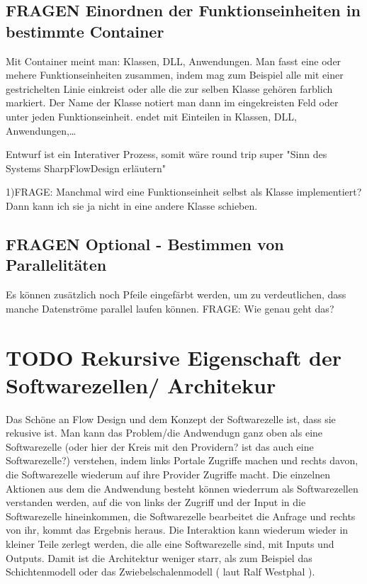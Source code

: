\documentclass[11pt]{article}
\begin{document}
\subsection{{\bfseries\sffamily FRAGEN} Einordnen der Funktionseinheiten in bestimmte Container}
\label{sec:orgheadline49}

Mit Container meint man: Klassen, DLL, Anwendungen.
Man fasst eine oder mehere Funktionseinheiten zusammen, indem mag zum Beispiel alle mit einer gestrichelten Linie einkreist oder alle die zur selben Klasse
gehören farblich markiert. Der Name der Klasse notiert man dann im eingekreisten Feld oder unter jeden Funktionseinheit.
  endet mit Einteilen in Klassen, DLL, Anwendungen,\ldots{}

Entwurf ist ein Interativer Prozess, somit wäre round trip super "Sinn des Systems SharpFlowDesign erläutern"

1)FRAGE: Manchmal wird eine Funktionseinheit selbst als Klasse implementiert? Dann kann ich sie ja nicht in eine andere Klasse schieben.

\subsection{{\bfseries\sffamily FRAGEN} Optional - Bestimmen von Parallelitäten}
\label{sec:orgheadline50}
Es können zusätzlich noch Pfeile eingefärbt werden, um zu verdeutlichen, dass
manche Datenströme parallel laufen können.
FRAGE: Wie genau geht das?
\section{{\bfseries\sffamily TODO} Rekursive Eigenschaft der Softwarezellen/ Architekur}
\label{sec:orgheadline52}
Das Schöne an Flow Design und dem Konzept der Softwarezelle ist, dass sie rekusive ist.
Man kann das Problem/die Andwendugn ganz oben als eine Softwarezelle (oder hier der Kreis mit den Providern? ist das auch eine Softwarezelle?)
verstehen, indem links Portale Zugriffe machen und rechts davon, die Softwarezelle wiederum auf ihre Provider Zugriffe macht.
Die einzelnen Aktionen aus dem die Andwendung besteht können wiederrum als Softwarezellen verstanden werden, auf die von links 
der Zugriff und der Input in die Softwarezelle hineinkommen, die Softwarezelle bearbeitet die Anfrage und rechts von ihr, kommt das
Ergebnis heraus. Die Interaktion kann wiederum wieder in kleiner Teile zerlegt werden, die alle eine Softwarezelle sind, mit Inputs und
Outputs. Damit ist die Architektur weniger starr, als zum Beispiel das Schichtenmodell oder das Zwiebelschalenmodell ( laut Ralf Westphal ). 
\end{document}

